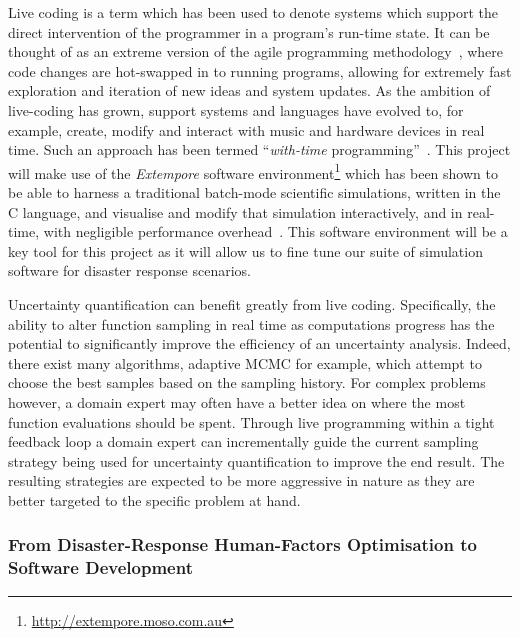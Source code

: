 \documentclass[a4paper,fontsize=12pt]{scrartcl}
\begin{document}
Live coding is a term which has been used to denote systems which
support the direct intervention of the programmer in a program's
run-time state. It can be thought of as an extreme version of the
agile programming methodology~\parencite{fowler_agile_2001}, where
code changes are hot-swapped in to running programs, allowing for
extremely fast exploration and iteration of new ideas and system
updates. As the ambition of live-coding has grown, support systems and
languages have evolved to, for example, create, modify and interact
with music and hardware devices in real time. Such an approach has
been termed ``\emph{with-time}
programming''~\parencite{sorensen2010programming}. This project will
make use of the \emph{Extempore} software
environment\footnote{\url{http://extempore.moso.com.au}} which has
been shown to be able to harness a traditional batch-mode scientific
simulations, written in the C language, and visualise and modify that
simulation interactively, and in real-time, with negligible
performance overhead~\cite{swift_live_2016}. This software environment
will be a key tool for this project as it will allow us to fine tune
our suite of simulation software for disaster response scenarios.

Uncertainty quantification can benefit greatly from live coding. Specifically, the
ability to alter function sampling in real time as computations progress
has the potential to significantly improve the efficiency of an uncertainty analysis.
Indeed, there exist many algorithms, adaptive MCMC for example, which attempt to 
choose the best samples based on the sampling history. 
For complex problems however, a domain expert may often have a better idea
on where the most function evaluations should be spent.
Through live programming within a tight feedback loop a domain expert can
incrementally guide the current sampling strategy being used for uncertainty 
quantification to improve the end result.
The resulting strategies are expected to be more aggressive in nature as they 
are better targeted to the specific problem at hand.


\subsubsection*{From Disaster-Response Human-Factors Optimisation to Software Development}


\end{document}
